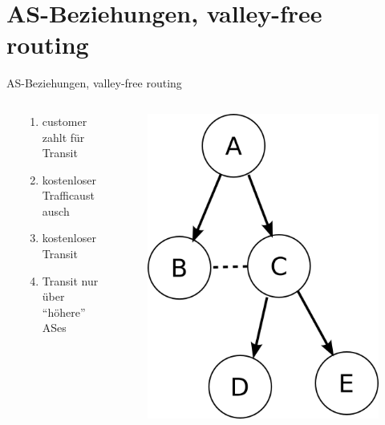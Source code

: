 \documentclass[ngerman,compress,hyperref={bookmarks}]{beamer}
\begin{document}
\section{AS-Beziehungen, valley-free routing}
\begin{frame}{AS-Beziehungen, valley-free routing}
 \begin{columns}[c]
  \begin{column}{0.2\textwidth}

  \end{column}

  \begin{column}{0.5\textwidth}
    \begin{enumerate}
     \item[customer-provier] customer zahlt für Transit
     \item[peering] kostenloser Trafficaustausch
     \item[sibling] kostenloser Transit\\ \vspace{0.5cm}
     \item[valley-free routing] Transit nur über ``höhere'' ASes
    \end{enumerate}

  \end{column}
  \begin{column}{0.3\textwidth}
   \begin{figure}
    \label{asrelations}
    \includegraphics[width=1\textwidth]{images/asrelation}
   \end{figure}
    {\scriptsize }
  \end{column}


\end{columns}
\end{frame}
\end{document}
